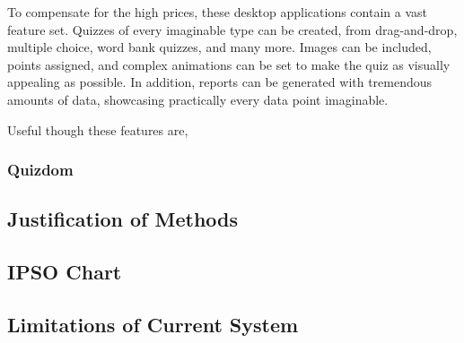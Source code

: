 To compensate for the high prices, these desktop applications contain a vast feature set. Quizzes of every imaginable type can be created, from drag-and-drop, multiple choice, word bank quizzes, and many more. Images can be included, points assigned, and complex animations can be set to make the quiz as visually appealing as possible. In addition, reports can be generated with tremendous amounts of data, showcasing practically every data point imaginable.

Useful though these features are, 

\subsubsection{Quizdom}


\subsection{Justification of Methods}

\subsection{IPSO Chart}

\subsection{Limitations of Current System}
